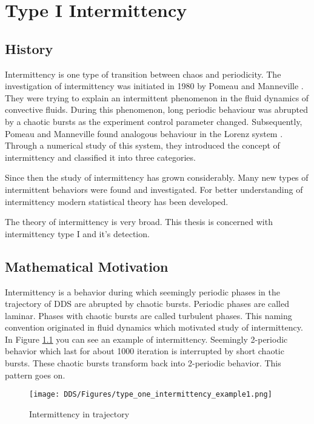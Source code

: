 \chapter{Type I Intermittency}
\label{chap:intermittency_review}

\section{History}
Intermittency is one type of transition between chaos and periodicity.
The investigation of intermittency was initiated in 1980 by Pomeau and Manneville \cite{Pomeau1980}.
They were trying to explain an intermittent phenomenon in the fluid dynamics of convective fluids.
During this phenomenon, long periodic behaviour was abrupted by a chaotic bursts as the experiment control parameter changed.
Subsequently, Pomeau and Manneville found analogous behaviour in the Lorenz system \cite{Lorenz2004}.
Through a numerical study of this system, they introduced the concept of intermittency and classified it into three categories. \cite{Pomeau1980}
\par
Since then the study of intermittency has grown considerably.
Many new types of intermittent behaviors were found and investigated.
For better understanding of intermittency modern statistical theory has been developed.
\cite{Elaskar2017}
\par
The theory of intermittency is very broad.
This thesis is concerned with intermittency type I and it's detection.

\section{Mathematical Motivation}
Intermittency is a behavior during which seemingly periodic phases in the trajectory of DDS are abrupted by chaotic bursts.
Periodic phases are called laminar.
Phases with chaotic bursts are called turbulent phases.
This naming convention originated in fluid dynamics which motivated study of intermittency. \cite{Pomeau1980}
\\
In Figure \ref{fig:intermittent_trajectory_example} you can see an example of intermittency.
Seemingly 2-periodic behavior which last for about 1000 iteration is interrupted by short chaotic bursts.
These chaotic bursts transform back into 2-periodic behavior.
This pattern goes on.

\begin{figure}[!h]
    \centering
    \texttt{[image: DDS/Figures/type\_one\_intermittency\_example1.png]}
    \caption{Intermittency in trajectory}
    \label{fig:intermittent_trajectory_example}
\end{figure}

